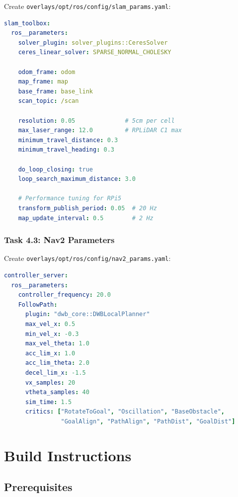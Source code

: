 \documentclass[11pt,letterpaper]{article}
\begin{document}
Create \texttt{overlays/opt/ros/config/slam\_params.yaml}:

\begin{lstlisting}[language=yaml, caption=slam\_params.yaml]
slam_toolbox:
  ros__parameters:
    solver_plugin: solver_plugins::CeresSolver
    ceres_linear_solver: SPARSE_NORMAL_CHOLESKY

    odom_frame: odom
    map_frame: map
    base_frame: base_link
    scan_topic: /scan

    resolution: 0.05              # 5cm per cell
    max_laser_range: 12.0         # RPLiDAR C1 max
    minimum_travel_distance: 0.3
    minimum_travel_heading: 0.3

    do_loop_closing: true
    loop_search_maximum_distance: 3.0

    # Performance tuning for RPi5
    transform_publish_period: 0.05  # 20 Hz
    map_update_interval: 0.5        # 2 Hz
\end{lstlisting}

\subsubsection{Task 4.3: Nav2 Parameters}

Create \texttt{overlays/opt/ros/config/nav2\_params.yaml}:

\begin{lstlisting}[language=yaml, caption=nav2\_params.yaml (DWA Controller)]
controller_server:
  ros__parameters:
    controller_frequency: 20.0
    FollowPath:
      plugin: "dwb_core::DWBLocalPlanner"
      max_vel_x: 0.5
      min_vel_x: -0.3
      max_vel_theta: 1.0
      acc_lim_x: 1.0
      acc_lim_theta: 2.0
      decel_lim_x: -1.5
      vx_samples: 20
      vtheta_samples: 40
      sim_time: 1.5
      critics: ["RotateToGoal", "Oscillation", "BaseObstacle",
                "GoalAlign", "PathAlign", "PathDist", "GoalDist"]
\end{lstlisting}

\section{Build Instructions}

\subsection{Prerequisites}
\end{document}
